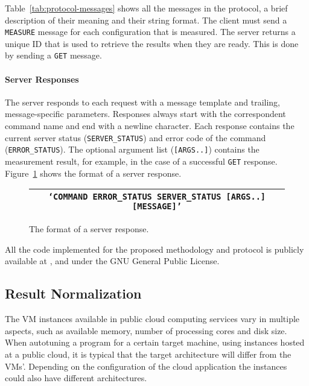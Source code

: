 Table~\ref{tab:protocol-messages} shows all the messages in the protocol, a
brief description of their meaning and their string format. The client must
send a \texttt{\footnotesize MEASURE} message for each configuration that is
measured. The server returns a unique ID that is used to retrieve the results
when they are ready. This is done by sending a \texttt{\footnotesize GET}
message.

\paragraph{Server Responses}

The server responds to each request with a message template and trailing,
message-specific parameters. Responses always start with the correspondent
command name and end with a newline character.  Each response contains the
current server status (\texttt{\footnotesize SERVER\_STATUS}) and error code of
the command (\texttt{\footnotesize ERROR\_STATUS}).  The optional argument list
(\texttt{\footnotesize [ARGS..]}) contains the measurement result, for example,
in the case of a successful \texttt{\footnotesize GET} response.
Figure~\ref{fig:response-template} shows the format of a server response.

\begin{figure}[htpb]
    \centering
    \footnotesize
    \begin{tabular}{@{}c@{}}
        \toprule
        {\tt \lq{}COMMAND ERROR\_STATUS SERVER\_STATUS [ARGS..] [MESSAGE]\rq{}} \\ \bottomrule
    \end{tabular}
    \caption{The format of a server response.}
    \label{fig:response-template}
\end{figure}

All the code implemented for the proposed methodology and protocol is publicly
available at ,
 and
 under the GNU General Public License.

\subsection{Result Normalization}
\label{sec:norm}

The VM instances available in public cloud computing services vary in multiple
aspects, such as available memory, number of processing cores and disk size.
When autotuning a program for a certain target machine, using instances hosted
at a public cloud, it is typical that the target architecture will differ from
the VMs'. Depending on the configuration of the cloud application the instances
could also have different architectures.

